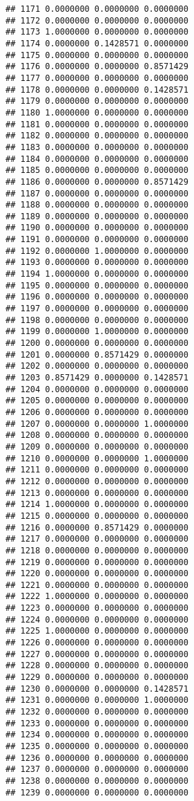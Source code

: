 \documentclass[
]{article}
\begin{document}
\begin{verbatim}
## 1171 0.0000000 0.0000000 0.0000000
## 1172 0.0000000 0.0000000 0.0000000
## 1173 1.0000000 0.0000000 0.0000000
## 1174 0.0000000 0.1428571 0.0000000
## 1175 0.0000000 0.0000000 0.0000000
## 1176 0.0000000 0.0000000 0.8571429
## 1177 0.0000000 0.0000000 0.0000000
## 1178 0.0000000 0.0000000 0.1428571
## 1179 0.0000000 0.0000000 0.0000000
## 1180 1.0000000 0.0000000 0.0000000
## 1181 0.0000000 0.0000000 0.0000000
## 1182 0.0000000 0.0000000 0.0000000
## 1183 0.0000000 0.0000000 0.0000000
## 1184 0.0000000 0.0000000 0.0000000
## 1185 0.0000000 0.0000000 0.0000000
## 1186 0.0000000 0.0000000 0.8571429
## 1187 0.0000000 0.0000000 0.0000000
## 1188 0.0000000 0.0000000 0.0000000
## 1189 0.0000000 0.0000000 0.0000000
## 1190 0.0000000 0.0000000 0.0000000
## 1191 0.0000000 0.0000000 0.0000000
## 1192 0.0000000 1.0000000 0.0000000
## 1193 0.0000000 0.0000000 0.0000000
## 1194 1.0000000 0.0000000 0.0000000
## 1195 0.0000000 0.0000000 0.0000000
## 1196 0.0000000 0.0000000 0.0000000
## 1197 0.0000000 0.0000000 0.0000000
## 1198 0.0000000 0.0000000 0.0000000
## 1199 0.0000000 1.0000000 0.0000000
## 1200 0.0000000 0.0000000 0.0000000
## 1201 0.0000000 0.8571429 0.0000000
## 1202 0.0000000 0.0000000 0.0000000
## 1203 0.8571429 0.0000000 0.1428571
## 1204 0.0000000 0.0000000 0.0000000
## 1205 0.0000000 0.0000000 0.0000000
## 1206 0.0000000 0.0000000 0.0000000
## 1207 0.0000000 0.0000000 1.0000000
## 1208 0.0000000 0.0000000 0.0000000
## 1209 0.0000000 0.0000000 0.0000000
## 1210 0.0000000 0.0000000 1.0000000
## 1211 0.0000000 0.0000000 0.0000000
## 1212 0.0000000 0.0000000 0.0000000
## 1213 0.0000000 0.0000000 0.0000000
## 1214 1.0000000 0.0000000 0.0000000
## 1215 0.0000000 0.0000000 0.0000000
## 1216 0.0000000 0.8571429 0.0000000
## 1217 0.0000000 0.0000000 0.0000000
## 1218 0.0000000 0.0000000 0.0000000
## 1219 0.0000000 0.0000000 0.0000000
## 1220 0.0000000 0.0000000 0.0000000
## 1221 0.0000000 0.0000000 0.0000000
## 1222 1.0000000 0.0000000 0.0000000
## 1223 0.0000000 0.0000000 0.0000000
## 1224 0.0000000 0.0000000 0.0000000
## 1225 1.0000000 0.0000000 0.0000000
## 1226 0.0000000 0.0000000 0.0000000
## 1227 0.0000000 0.0000000 0.0000000
## 1228 0.0000000 0.0000000 0.0000000
## 1229 0.0000000 0.0000000 0.0000000
## 1230 0.0000000 0.0000000 0.1428571
## 1231 0.0000000 0.0000000 1.0000000
## 1232 0.0000000 0.0000000 0.0000000
## 1233 0.0000000 0.0000000 0.0000000
## 1234 0.0000000 0.0000000 0.0000000
## 1235 0.0000000 0.0000000 0.0000000
## 1236 0.0000000 0.0000000 0.0000000
## 1237 0.0000000 0.0000000 0.0000000
## 1238 0.0000000 0.0000000 0.0000000
## 1239 0.0000000 0.0000000 0.0000000

\end{verbatim}
\end{document}
